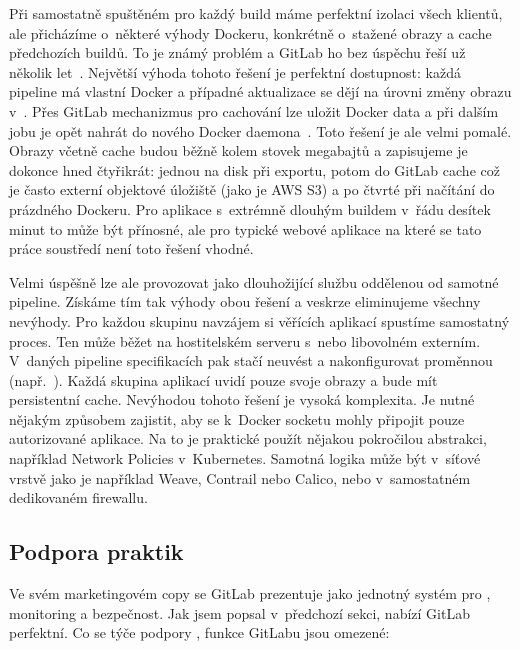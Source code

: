         Při samostatně spuštěném  pro každý build máme perfektní izolaci všech klientů, ale přicházíme o~některé výhody Dockeru, konkrétně o~stažené obrazy a cache předchozích buildů. To je známý problém a GitLab ho bez úspěchu řeší už několik let~\cite{gitlab-docker-artifact-caching}. Největší výhoda tohoto řešení je perfektní dostupnost: každá pipeline má vlastní Docker a případné aktualizace se dějí na úrovni změny obrazu v~. Přes GitLab mechanizmus pro cachování lze uložit Docker data a při dalším jobu je opět nahrát do nového Docker daemona~\cite{patel-docker-cache}. Toto řešení je ale velmi pomalé. Obrazy včetně cache budou běžně kolem stovek megabajtů a zapisujeme je dokonce hned čtyřikrát: jednou na disk při exportu, potom do GitLab cache což je často externí objektové úložiště (jako je AWS S3) a po čtvrté při načítání do prázdného Dockeru. Pro aplikace s~extrémně dlouhým buildem v~řádu desítek minut to může být přínosné, ale pro typické webové aplikace na které se tato práce soustředí není toto řešení vhodné.

        Velmi úspěšně lze ale  provozovat jako dlouhožijící službu oddělenou od samotné \CI pipeline. Získáme tím tak výhody obou řešení a veskrze eliminujeme všechny nevýhody. Pro každou skupinu navzájem si věřících aplikací spustíme samostatný  proces. Ten může běžet na hostitelském serveru s~\CI nebo libovolném externím. V~daných pipeline specifikacích pak stačí neuvést  a nakonfigurovat proměnnou  (např.~). Každá skupina aplikací uvidí pouze svoje obrazy a bude mít persistentní cache. Nevýhodou tohoto řešení je vysoká komplexita. Je nutné nějakým způsobem zajistit, aby se k~Docker socketu mohly připojit pouze autorizované aplikace. Na to je praktické použít nějakou pokročilou abstrakci, například Network Policies v~Kubernetes. Samotná  logika může být v~síťové vrstvě jako je například Weave, Contrail nebo Calico, nebo v~samostatném dedikovaném firewallu.

    \subsection{Podpora \CD praktik}
        Ve svém marketingovém copy se GitLab prezentuje jako jednotný systém pro \CICD, monitoring a bezpečnost. Jak jsem popsal v~předchozí sekci, \CI nabízí GitLab perfektní. Co se týče podpory \CD, funkce GitLabu jsou omezené:

